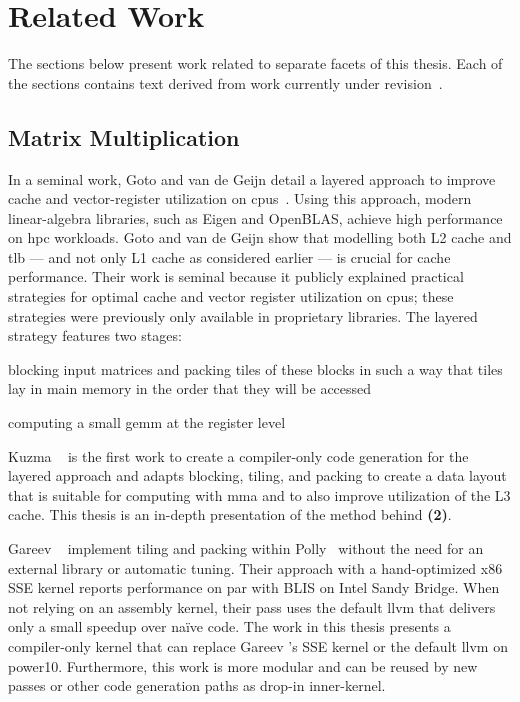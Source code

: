\documentclass[\main/thesis.tex]{subfiles}
\begin{document}
\chapter{Related Work}
\label{cha:related}
The sections below present work related to separate facets of this thesis.
Each of the sections contains text derived from work currently under revision~\autocite{kuzma2021fast}.

\section{Matrix Multiplication}
In a seminal work, Goto and van de Geijn detail a layered approach to improve cache and vector-register utilization on \glspl{cpu}~\autocite{goto2008anatomy}.
Using this approach, modern linear-algebra libraries, such as Eigen and OpenBLAS, achieve high performance on \gls{hpc} workloads.
Goto and van de Geijn show that modelling both L2 cache and \gls{tlb} --- and not only L1 cache as considered earlier --- is crucial for cache performance.
Their work is seminal because it publicly explained practical strategies for optimal cache and vector register utilization on \glspl{cpu}; these strategies were previously only available in proprietary libraries.
The layered strategy features two stages:
\begin{enumerate*}[itemjoin={{; }}, itemjoin*={{; and }}, label=\textbf{(\arabic*)}, after={.}]
  \item blocking input matrices and packing tiles of these blocks in such a way that tiles lay in main memory in the order that they will be accessed
  \item computing a small \gls{gemm} at the register level
\end{enumerate*}
Kuzma \etal~\autocite{kuzma2021fast} is the first work to create a compiler-only code generation for the layered approach and adapts blocking, tiling, and packing to create a data layout that is suitable for computing with \gls{mma} and to also improve utilization of the L3 cache.
This thesis is an in-depth presentation of the method behind \textbf{(2)}.

Gareev \etal~\autocite{gareev2018high} implement tiling and packing within Polly~\autocite{grosser2011polly,grosser2012polly} without the need for an external library or automatic tuning.
Their approach with a hand-optimized x86 SSE kernel reports performance on par with BLIS on Intel Sandy Bridge.
When not relying on an assembly kernel, their pass uses the default \gls{llvm}  that delivers only a small speedup over na\"ive code.
The work in this thesis presents a compiler-only kernel that can replace Gareev \etal's SSE kernel or the default \gls{llvm}  on \gls{power10}.
Furthermore, this work is more modular and can be reused by new passes or other code generation paths as drop-in inner-kernel.
\end{document}

